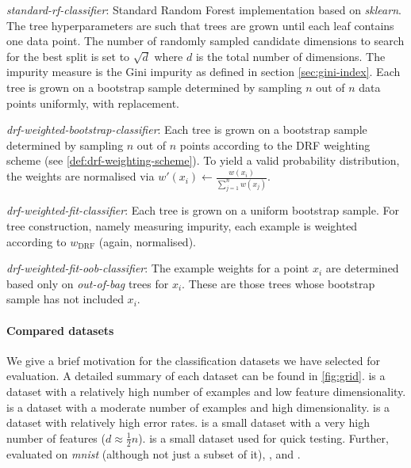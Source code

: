 \documentclass[../main.tex]{subfiles}
\begin{document}
\textit{standard-rf-classifier}: Standard Random Forest implementation based on \textit{sklearn}. The tree hyperparameters are such that trees are grown until each leaf contains one data point. The number of randomly sampled candidate dimensions to search for the best split is set to $\sqrt{d}$ where $d$ is the total number of dimensions. The impurity measure is the Gini impurity as defined in section \ref{sec:gini-index}. Each tree is grown on a bootstrap sample determined by sampling $n$ out of $n$ data points uniformly, with replacement.

\textit{drf-weighted-bootstrap-classifier}: Each tree is grown on a bootstrap sample determined by sampling $n$ out of $n$ points according to the DRF weighting scheme (see \ref{def:drf-weighting-scheme}). To yield a valid probability distribution, the weights are normalised via $w'(x_i) \gets \frac{w(x_i)}{\sum_{j=1}^n w(x_j)}$.

\textit{drf-weighted-fit-classifier}: Each tree is grown on a uniform bootstrap sample. For tree construction, namely measuring impurity, each example is weighted according to $w_{\text{DRF}}$ (again, normalised).

\textit{drf-weighted-fit-oob-classifier}: The example weights for a point $x_i$ are determined based only on \textit{out-of-bag} trees for $x_i$. These are those trees whose bootstrap sample has not included $x_i$.

\paragraph{Compared datasets} We give a brief motivation for the classification datasets we have selected for evaluation. A detailed summary of each dataset can be found in \ref{fig:grid}.
\cover is a dataset with a relatively high number of examples and low feature dimensionality. \mnist is a dataset with a moderate number of examples and high dimensionality. \diabetes is a dataset with relatively high error rates. \bioresponse is a small dataset with a very high number of features ($d \approx \frac{1}{2}n$). \qsar is a small dataset used for quick testing.
Further, \cite{bernard, xuChen} evaluated on \textit{mnist} (although not just a subset of it), \spambase, \digits and \diabetes.
\end{document}
